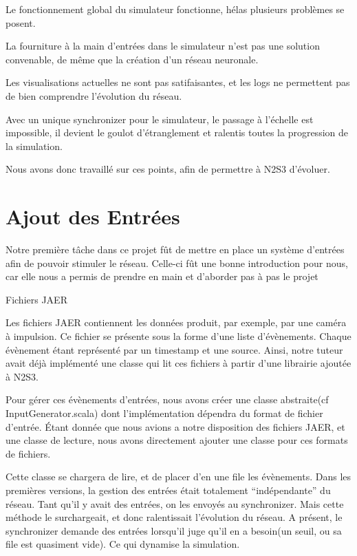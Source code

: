 \documentclass{article}
\begin{document}
Le fonctionnement global du simulateur fonctionne, hélas plusieurs problèmes se posent. 

La fourniture à la main d’entrées dans le simulateur n’est pas une solution convenable, de même que la création d’un réseau neuronale.

Les visualisations actuelles ne sont pas satifaisantes, et les logs ne permettent pas de bien comprendre l’évolution du réseau.

Avec un unique synchronizer pour le simulateur, le passage à l’échelle est impossible, il devient le goulot d’étranglement et ralentis toutes la progression de la simulation.

Nous avons donc travaillé sur ces points, afin de permettre à N2S3 d’évoluer.


\section{Ajout des Entrées}

    Notre première tâche dans ce projet fût de mettre en place un système d'entrées afin de pouvoir stimuler le réseau. Celle-ci fût une bonne introduction pour nous, car elle nous a permis de prendre en main et d’aborder pas à pas le projet

    Fichiers JAER

    Les fichiers JAER contiennent les données produit, par exemple, par une caméra à impulsion. Ce fichier se présente sous la forme d’une liste d'évènements. Chaque évènement étant représenté par un timestamp et une source. Ainsi, notre tuteur avait déjà implémenté une classe qui lit ces fichiers à partir d’une librairie ajoutée à N2S3. 

    Pour gérer ces évènements d’entrées, nous avons créer une classe abstraite(cf InputGenerator.scala) dont l’implémentation dépendra du format de fichier d’entrée. Étant donnée que nous avions a notre disposition des fichiers JAER, et une classe de lecture, nous avons directement ajouter une classe pour ces formats de fichiers.

    Cette classe se chargera de lire, et de placer d’en une file les évènements. Dans les premières versions, la gestion des entrées était totalement “indépendante” du réseau. Tant qu’il y avait des entrées, on les envoyés au synchronizer. Mais cette méthode le surchargeait, et donc ralentissait l’évolution du réseau. A présent, le synchronizer demande des entrées lorsqu’il juge qu’il en a besoin(un seuil, ou sa file est quasiment vide). Ce qui dynamise la simulation.
\end{document}
